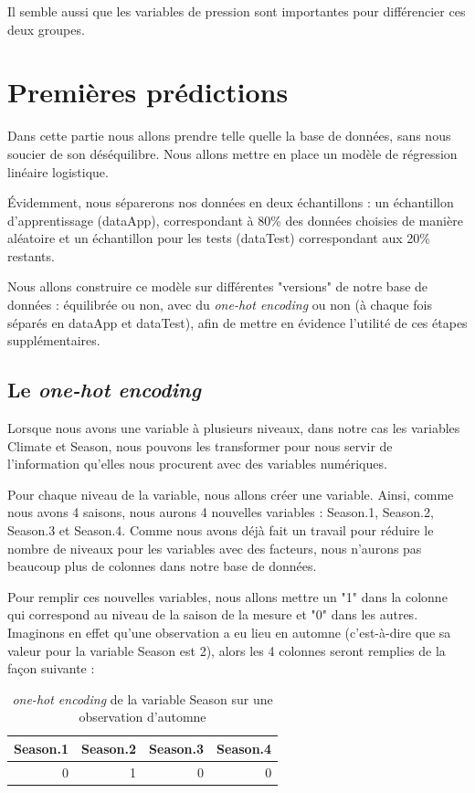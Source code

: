 \documentclass{article}
\begin{document}
Il semble aussi que les variables de pression sont importantes pour différencier ces deux groupes. 

\section{Premières prédictions}

Dans cette partie nous allons prendre telle quelle la base de données, sans nous soucier de son déséquilibre. Nous allons mettre en place un modèle de régression linéaire logistique.

Évidemment, nous séparerons nos données en deux échantillons : un échantillon d'apprentissage (dataApp), correspondant à 80\% des données choisies de manière aléatoire et un échantillon pour les tests (dataTest) correspondant aux 20\% restants.

Nous allons construire ce modèle sur différentes "versions" de notre base de données : équilibrée ou non, avec du \emph{one-hot encoding} ou non (à chaque fois séparés en dataApp et dataTest), afin de mettre en évidence l'utilité de ces étapes supplémentaires.

\subsection{Le \emph{one-hot encoding}}

Lorsque nous avons une variable à plusieurs niveaux, dans notre cas les variables Climate et Season, nous pouvons les transformer pour nous servir de l'information qu'elles nous procurent avec des variables numériques. 

Pour chaque niveau de la variable, nous allons créer une variable. Ainsi, comme nous avons 4 saisons, nous aurons 4 nouvelles variables : Season.1, Season.2, Season.3 et Season.4. Comme nous avons déjà fait un travail pour réduire le nombre de niveaux pour les variables avec des facteurs, nous n'aurons pas beaucoup plus de colonnes dans notre base de données. 

Pour remplir ces nouvelles variables, nous allons mettre un "1" dans la colonne qui correspond au niveau de la saison de la mesure et "0" dans les autres. Imaginons en effet qu'une observation a eu lieu en automne (c'est-à-dire que sa valeur pour la variable Season est 2), alors les 4 colonnes seront remplies de la façon suivante : 

\begin{table}[H]
    \centering
    \begin{tabular}{|rrrr|}
        \hline
        Season.1 & Season.2 & Season.3 & Season.4 \\
        \hline 
        0 & 1 & 0 & 0 \\
        \hline
    \end{tabular}
    \caption{\emph{one-hot encoding} de la variable Season sur une observation d'automne}
\end{table}
\end{document}
